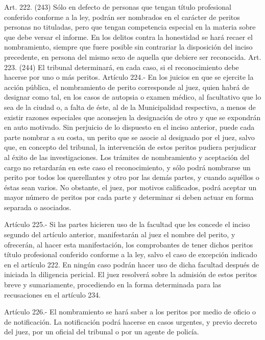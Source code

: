     Art. 222. (243) Sólo en defecto de personas que tengan título profesional conferido conforme a la ley, podrán ser nombrados en el carácter de peritos personas no tituladas, pero que tengan competencia especial en la materia sobre que debe versar el informe.
    En los delitos contra la honestidad se hará recaer el nombramiento, siempre que fuere posible sin contrariar la disposición del inciso precedente, en persona del mismo sexo de aquella que debiere ser reconocida.
    Art. 223. (244) El tribunal determinará, en cada caso, si el reconocimiento debe hacerse por uno o más peritos.
    Artículo 224.-  En los juicios en que se ejercite la acción pública, el nombramiento de perito corresponde al juez, quien habrá de designar como tal, en los casos de autopsia o examen médico, al facultativo que lo sea de la ciudad o, a falta de éste, al de la Municipalidad respectiva, a menos de existir razones especiales que aconsejen la designación de otro y que se expondrán en auto motivado.
    Sin perjuicio de lo dispuesto en el inciso anterior, puede cada parte nombrar a su costa, un perito que se asocie al designado por el juez, salvo que, en concepto del tribunal, la intervención de estos peritos pudiera perjudicar al éxito de las investigaciones. Los trámites de nombramiento y aceptación del cargo no retardarán en este caso el reconocimiento, y sólo podrá nombrarse un perito por todos los querellantes y otro por las demás partes, y cuando aquéllos o éstas sean varios. No obstante, el juez, por motivos calificados, podrá aceptar un mayor número de peritos por cada parte y determinar si deben actuar en forma separada o asociados.

    Artículo 225.- Si las partes hicieren uso de la facultad que les concede el inciso segundo del artículo anterior, manifestarán al juez el nombre del perito, y ofrecerán, al hacer esta manifestación, los comprobantes de tener dichos peritos título profesional conferido conforme a la ley, salvo el caso de excepción indicado en el artículo 222.
    En ningún caso podrán hacer uso de dicha facultad después de iniciada la diligencia pericial.
    El juez resolverá sobre la admisión de estos peritos breve y sumariamente, procediendo en la forma determinada para las recusaciones en el artículo 234.

    Artículo 226.- El nombramiento se hará saber a los peritos por medio de oficio o de notificación. La notificación podrá hacerse en casos urgentes, y previo decreto del juez, por un oficial del tribunal o por un agente de policía.


